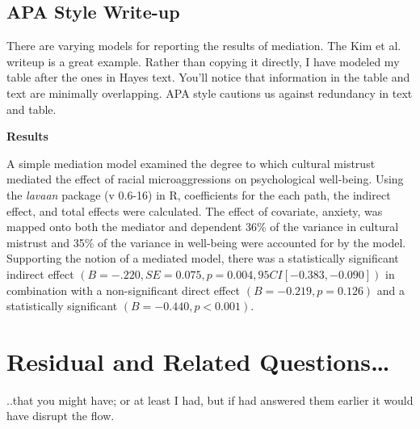 \documentclass[
  11pt,
]{book}
\begin{document}
\hypertarget{apa-style-write-up}{%
\subsection{APA Style Write-up}\label{apa-style-write-up}}

There are varying models for reporting the results of mediation. The Kim et al. \citep{kim_racial_2017} writeup is a great example. Rather than copying it directly, I have modeled my table after the ones in Hayes \citeyearpar{hayes_introduction_2018} text. You'll notice that information in the table and text are minimally overlapping. APA style cautions us against redundancy in text and table.

\textbf{Results}

A simple mediation model examined the degree to which cultural mistrust mediated the effect of racial microaggressions on psychological well-being. Using the \emph{lavaan} package (v 0.6-16) in R, coefficients for the each path, the indirect effect, and total effects were calculated. The effect of covariate, anxiety, was mapped onto both the mediator and dependent 36\% of the variance in cultural mistrust and 35\% of the variance in well-being were accounted for by the model. Supporting the notion of a mediated model, there was a statistically significant indirect effect \((B = -.220, SE = 0.075, p = 0.004, 95CI[-0.383,-0.090])\) in combination with a non-significant direct effect \((B = -0.219, p = 0.126)\) and a statistically significant \((B = -0.440, p < 0.001)\).

\hypertarget{residual-and-related-questions}{%
\section{Residual and Related Questions\ldots{}}\label{residual-and-related-questions}}

..that you might have; or at least I had, but if had answered them earlier it would have disrupt the flow.
\end{document}
